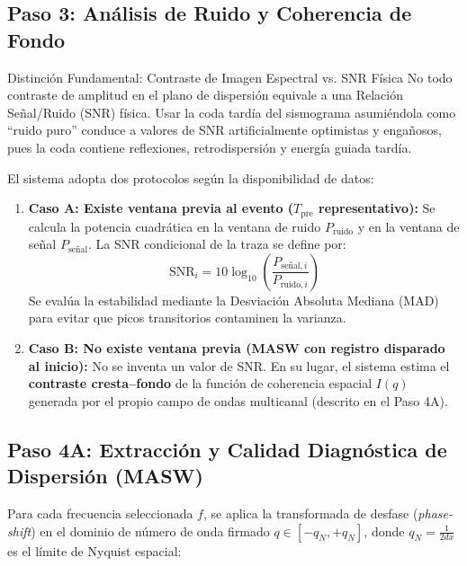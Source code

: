 \documentclass[11pt,a4paper]{article}
\begin{document}
\subsection{Paso 3: Análisis de Ruido y Coherencia de Fondo}
\begin{warningbox}{Distinción Fundamental: Contraste de Imagen Espectral vs. SNR Física}
No todo contraste de amplitud en el plano de dispersión equivale a una Relación Señal/Ruido (SNR) física. Usar la coda tardía del sismograma asumiéndola como ``ruido puro'' conduce a valores de SNR artificialmente optimistas y engañosos, pues la coda contiene reflexiones, retrodispersión y energía guiada tardía.
\end{warningbox}

El sistema adopta dos protocolos según la disponibilidad de datos:
\begin{enumerate}
    \item \textbf{Caso A: Existe ventana previa al evento ($T_{\text{pre}}$ representativo):}
    Se calcula la potencia cuadrática en la ventana de ruido $P_{\text{ruido}}$ y en la ventana de señal $P_{\text{señal}}$. La SNR condicional de la traza se define por:
    \begin{equation}
        \text{SNR}_i = 10 \log_{10} \left( \frac{P_{\text{señal}, i}}{P_{\text{ruido}, i}} \right)
    \end{equation}
    Se evalúa la estabilidad mediante la Desviación Absoluta Mediana (MAD) para evitar que picos transitorios contaminen la varianza.
    \item \textbf{Caso B: No existe ventana previa (MASW con registro disparado al inicio):}
    No se inventa un valor de SNR. En su lugar, el sistema estima el \textbf{contraste cresta--fondo} de la función de coherencia espacial $I(q)$ generada por el propio campo de ondas multicanal (descrito en el Paso 4A).
\end{enumerate}

\newpage
\subsection{Paso 4A: Extracción y Calidad Diagnóstica de Dispersión (MASW)}
Para cada frecuencia seleccionada $f$, se aplica la transformada de desfase (\emph{phase-shift}) en el dominio de número de onda firmado $q \in [-q_N, +q_N]$, donde $q_N = \frac{1}{2 dx}$ es el límite de Nyquist espacial:
\end{document}
